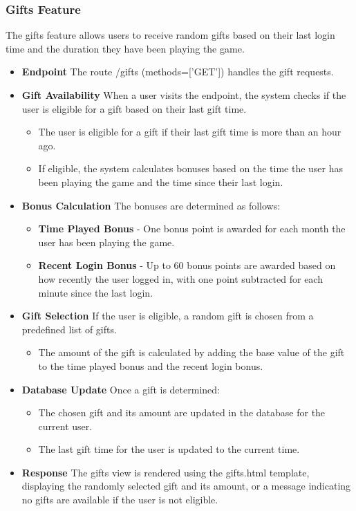 \documentclass[12pt]{article}
\begin{document}
\subsubsection{Gifts Feature}
The gifts feature allows users to receive random gifts based on their last login time and the duration they have been playing the game.
\begin{itemize}
\item \textbf{Endpoint} The route /gifts (methods=['GET']) handles the gift requests.
\item \textbf{Gift Availability} When a user visits the endpoint, the system checks if the user is eligible for a gift based on their last gift time.
\begin{itemize}
\item The user is eligible for a gift if their last gift time is more than an hour ago.
\item If eligible, the system calculates bonuses based on the time the user has been playing the game and the time since their last login.
\end{itemize}
\item \textbf{Bonus Calculation} The bonuses are determined as follows:
\begin{itemize}
\item \textbf{Time Played Bonus} - One bonus point is awarded for each month the user has been playing the game.
\item \textbf{Recent Login Bonus} - Up to 60 bonus points are awarded based on how recently the user logged in, with one point subtracted for each minute since the last login.
\end{itemize}
\item \textbf{Gift Selection} If the user is eligible, a random gift is chosen from a predefined list of gifts.
\begin{itemize}
\item The amount of the gift is calculated by adding the base value of the gift to the time played bonus and the recent login bonus.
\end{itemize}
\item \textbf{Database Update} Once a gift is determined:
\begin{itemize}
\item The chosen gift and its amount are updated in the database for the current user.
\item The last gift time for the user is updated to the current time.
\end{itemize}
\item \textbf{Response} The gifts view is rendered using the gifts.html template, displaying the randomly selected gift and its amount, or a message indicating no gifts are available if the user is not eligible.
\end{itemize}
\end{document}
